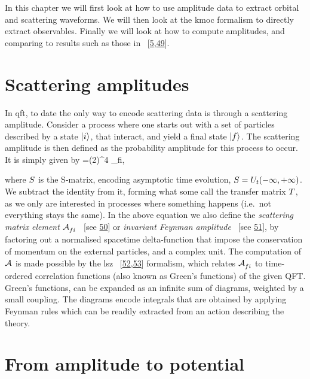 \documentclass[
  11pt,
  a4paper,
  DIV=11,
  numbers=noendperiod,
  twoside]{scrreprt}
\let\[\relax \let\]\relax %
\DeclareRobustCommand{\[}{\begin{equation}}
\DeclareRobustCommand{\]}{\end{equation}}
\begin{document}
In this chapter we will first look at how to use amplitude data to
extract orbital and scattering waveforms. We will then look at the
\gls{kmoc} formalism to directly extract observables. Finally we will
look at how to compute amplitudes, and comparing to results such as
those in
~{[}\protect\hyperlink{ref-Kosower:2018adc}{5},\protect\hyperlink{ref-Bern:2021xze}{49}{]}.

\hypertarget{sec-scatamp}{%
\section{Scattering amplitudes}\label{sec-scatamp}}

In \gls{qft}, to date the only way to encode scattering data is through
a scattering amplitude. Consider a process where one starts out with a
set of particles described by a state \(\vert i \rangle_{\text{}}\), that interact, and
yield a final state \(\vert f \rangle_{\text{}}\). The scattering amplitude is then
defined as the probability amplitude for this process to occur. It is
simply given by
\[=(2\pi)^4 \im \ampl_{fi},\]

where \(S\) is the S-matrix, encoding asymptotic time evolution,
\(S=U_t(-\infty,+\infty)\). We subtract the identity from it,
forming what some call the transfer matrix \(T\), as we only are
interested in processes where something happens (i.e.~not everything
stays the same). In the above equation we also define the
\emph{scattering matrix element} \(\mathcal{A}^{}_{fi}\) ~{[}see
\protect\hyperlink{ref-Srednicki:2007}{50}{]} or \emph{invariant Feynman
amplitude} ~{[}see \protect\hyperlink{ref-Coleman:2018a}{51}{]}, by
factoring out a normalised spacetime delta-function that impose the
conservation of momentum on the external particles, and a complex unit.
The computation of \(\mathcal{A}^{}\) is made possible by the \gls{lsz}
~{[}\protect\hyperlink{ref-Lehmann:1954rq}{52},\protect\hyperlink{ref-Collins:2019ozc}{53}{]}
formalism, which relates \(\mathcal{A}^{}_{fi}\) to time-ordered correlation
functions (also known as Green's functions) of the given QFT. Green's
functions, can be expanded as an infinite sum of diagrams, weighted by a
small coupling. The diagrams encode integrals that are obtained by
applying Feynman rules which can be readily extracted from an action
describing the theory.

\hypertarget{sec-amp2pot}{%
\section{From amplitude to potential}\label{sec-amp2pot}}
\end{document}
